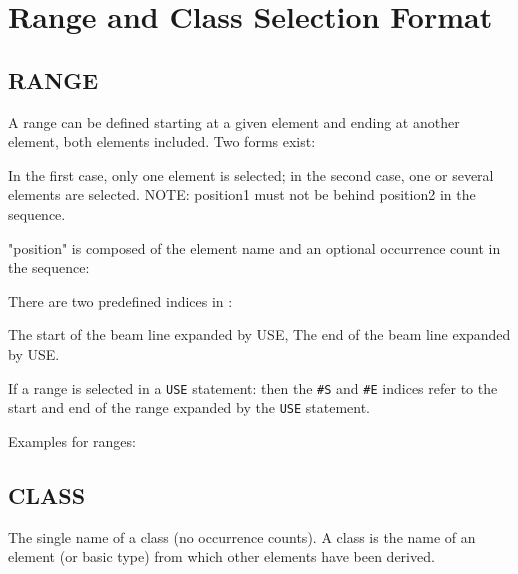 
\chapter{Range and Class Selection Format}

\section{RANGE}
\label{sec:range}

A range can be defined starting at  a given element and ending at
another element, both elements included. Two forms exist:  


In the first case, only one element is selected; in the second case, one
or several elements are selected. NOTE: position1 must not be behind
position2 in the sequence.  

"position" is composed of the element name and an optional occurrence 
count in the sequence: \label{range_position}

There are two predefined indices in \madx: 
\begin{madlist}
    The start of the beam line expanded by USE, 
    The end of the beam line expanded by USE. 
\end{madlist} 

If a range is selected in a \texttt{USE} statement: 
then the  \texttt{\#S} and \texttt{\#E} indices refer to the start and
end of the  range expanded by the \texttt{USE} statement. 

 Examples for ranges: 

\section{CLASS}
\label{sec:class} 
The single name of a class (no occurrence counts). A class is the name
of an element (or basic type) from which other elements have been
derived. 


